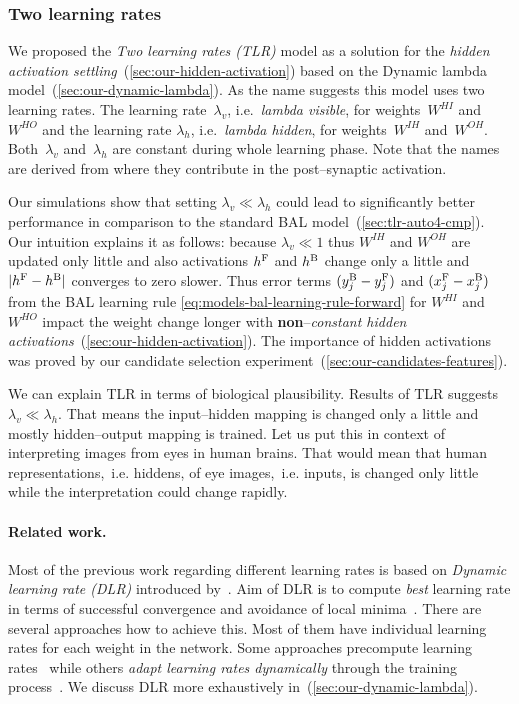 
\subsubsection{Two learning rates} 
\label{sec:our-tlr}

We proposed the \emph{Two learning rates (TLR)} model as a solution for the \emph{hidden activation settling}~(\ref{sec:our-hidden-activation}) based on the Dynamic lambda model~(\ref{sec:our-dynamic-lambda}). As the name suggests this model uses two learning rates. The learning rate~$\lambda_v$, i.e.~\emph{lambda visible}, for weights~$W^{HI}$ and~$W^{HO}$ and the learning rate $\lambda_h$, i.e.~\emph{lambda hidden}, for weights~$W^{IH}$ and~$W^{OH}$. Both~$\lambda_v$ and~$\lambda_h$ are constant during whole learning phase. Note that the names are derived from where they contribute in the post--synaptic activation. 

Our simulations show that setting $\lambda_v \ll \lambda_h$ could lead to significantly better performance in comparison to the standard BAL model~(\ref{sec:tlr-auto4-cmp}). Our intuition explains it as follows: because $\lambda_v \ll 1$ thus $W^{IH}$ and $W^{OH}$ are updated only little and also activations $h^{\rm F}$ and $h^{\rm B}$ change only a little and $|h^{\rm F}- h^{\rm B}|$ converges to zero slower. Thus error terms $(y_j^{\rm B} - y_j^{\rm F})$ and $(x_j^{\rm F} - x_j^{\rm B})$ from the BAL learning rule \ref{eq:models-bal-learning-rule-forward} for $W^{HI}$ and $W^{HO}$ impact the weight change longer with {\bf non}--\emph{constant hidden activations}~(\ref{sec:our-hidden-activation}). The importance of hidden activations was proved by our candidate selection experiment~(\ref{sec:our-candidates-features}). 

We can explain TLR in terms of biological plausibility. Results of TLR suggests $\lambda_v \ll \lambda_h$. That means the input--hidden mapping is changed only a little and mostly hidden--output mapping is trained. Let us put this in context of interpreting images from eyes in human brains. That would mean that human representations,~i.e. hiddens, of eye images,~i.e. inputs, is changed only little while the interpretation could change rapidly. 

\paragraph{Related work.} 
\label{sec:our-tlr-related-work}
Most of the previous work regarding different learning rates is based on \emph{Dynamic learning rate (DLR)} introduced by~\citet{jacobs1988increased}. Aim of DLR is to compute \emph{best} learning rate in terms of successful convergence and avoidance of local minima~\citep{behera2006adaptive}. There are several approaches how to achieve this. Most of them have individual learning rates for each weight in the network. Some approaches precompute learning rates~\citep{weir1991method} while others \emph{adapt learning rates dynamically} through the training process~\citep{yu1997efficient, magoulas1999improving, yu2002backpropagation}. We discuss DLR more exhaustively in~(\ref{sec:our-dynamic-lambda}). 

